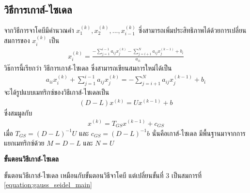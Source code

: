 \subsection{วิธีการเกาส์-ไซเดล}
จากวิธีการจาโคบีมีคำนวณคำ $x_1^{(k)},x_2^{(k)}, ... , x_{i-1}^{(k)}$ ซึ่งสามารถเพิ่มประสิทธิภาพได้ด้วยการเปลี่ยนสมการของ $x_i^{(k)}$ เป็น 
\begin{align}
    x_i^{(k)} = \frac{-\sum_{j=1}^{i-1} a_{ij}x_{j}^{(k)} - \sum_{j=i+1}^{N} a_{ij}x_{j}^{(k-1)} + b_i }{a_{ii}}
    \label{equation:gauss_seidel_main}
\end{align}
วิธ๊การนี้เรียกว่า วิธีการเกาส์-ไซเดล ซึ่งสามารถเขียนสมการใหม่ได้เป็น
\begin{align}
    a_{ii} x_{i}^{(k)} + \sum_{j=1}^{i-1} a_{ij} x_{j}^{(k)} = - \sum_{j=i+1}^{N} a_{ij} x_j^{(k-1)} + b_i
\end{align}
จะได้รูปแบบเมทริกซ์ของวิธีเกาส์-ไซเดลเป็น
\begin{align}
    (D - L) x^{(k)} = U x^{(k-1)} + b
\end{align}
ซึ่งสมมูลกับ
\begin{align}
    x^{(k)} = T_{GS} x^{(k-1)} + c_{GS}
\end{align}
เมื่อ $T_{GS} = (D - L)^{-1} U$ และ $c_{GS} = (D - L)^{-1} b$ นั่นคือเกาส์-ไซเดล มีพื้นฐานมาจากการแยกเมทริกซ์ด้วย $M = D - L$ และ $N = U$

\textbf{ขั้นตอนวิธีเกาส์-ไซเดล}

ขั้นตอนวิธีเกาส์-ไซเดล เหมือนกับขั้นตอนวิธีจาโคบี แต่เปลี่ยนขั้นที่ 3 เป็นสมการที่     \ref{equation:gauss_seidel_main} 